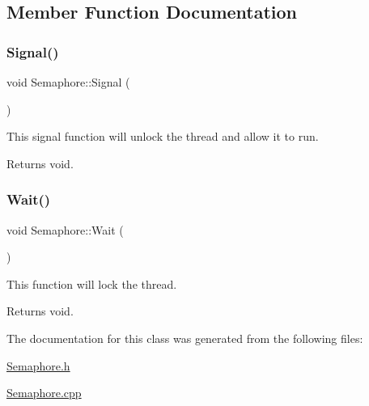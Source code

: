 \subsection{Member Function Documentation}
\mbox{\label{class_semaphore_a86f92f738b4486439b296d8e235895f2}} 
\subsubsection{\texorpdfstring{Signal()}{Signal()}}
{\footnotesize\ttfamily void Semaphore\+::\+Signal (\begin{DoxyParamCaption}{ }\end{DoxyParamCaption})}



This signal function will unlock the thread and allow it to run. 

\begin{DoxyReturn}{Returns}
void. 
\end{DoxyReturn}
\mbox{\label{class_semaphore_a72aabebf026e3a8b1f3e4d0fa8ee1eda}} 
\subsubsection{\texorpdfstring{Wait()}{Wait()}}
{\footnotesize\ttfamily void Semaphore\+::\+Wait (\begin{DoxyParamCaption}{ }\end{DoxyParamCaption})}



This function will lock the thread. 

\begin{DoxyReturn}{Returns}
void. 
\end{DoxyReturn}


The documentation for this class was generated from the following files\+:\begin{DoxyCompactItemize}
\item 
\mbox{\hyperlink{_semaphore_8h}{Semaphore.\+h}}\item 
\mbox{\hyperlink{_semaphore_8cpp}{Semaphore.\+cpp}}\end{DoxyCompactItemize}
